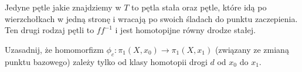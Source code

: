 \begin{solution}
  Jedyne pętle jakie znajdziemy w $T$ to pętla stała oraz pętle, które idą po wierzchołkach w jedną stronę i wracają po swoich śladach do punktu zaczepienia. Ten drugi rodzaj pętli to $ff^{-1}$ i jest homotopijne równy drodze stałej.
\end{solution}

\begin{problem}
  Uzasadnij, że homomorfizm $\phi_c:\pi_1(X, x_0)\to \pi_1(X, x_1)$ (związany ze zmianą punktu bazowego) zależy tylko od klasy homotopii drogi $d$ od $x_0$ do $x_1$.
\end{problem}

